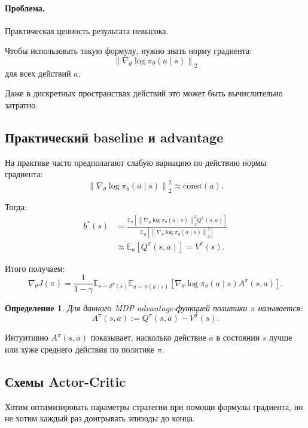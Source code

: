 \documentclass[12pt,a4paper]{article}
\newtheorem{definition}{Определение}
\begin{document}
\paragraph{Проблема.}

Практическая ценность результата невысока.

Чтобы использовать такую формулу, нужно знать норму градиента:
\[
\left\|
\nabla_\theta
\log \pi_\theta(a\mid s)
\right\|_2
\]
для всех действий $a$.

Даже в дискретных пространствах действий это может быть вычислительно затратно.

\subsection{Практический baseline и advantage}

На практике часто предполагают слабую вариацию по действию нормы градиента:
\[
\left\|
\nabla_\theta
\log \pi_\theta(a\mid s)
\right\|_2^2
\approx
\mathrm{const}(a).
\]

Тогда:
\[
\begin{aligned}
b^\ast(s)
&=
\frac{
\mathbb E_a
\left[
\left\|
\nabla_\theta
\log \pi_\theta(a\mid s)
\right\|_2^2
Q^\pi(s,a)
\right]
}{
\mathbb E_a
\left[
\left\|
\nabla_\theta
\log \pi_\theta(a\mid s)
\right\|_2^2
\right]
}
\\
&\approx
\mathbb E_a
\left[
Q^\pi(s,a)
\right]
=
V^\pi(s).
\end{aligned}
\]

Итого получаем:
\[
\nabla_\theta J(\pi)
=
\frac{1}{1-\gamma}
\mathbb E_{s\sim d^\pi(s)}
\mathbb E_{a\sim\pi(a\mid s)}
\left[
\nabla_\theta
\log \pi_\theta(a\mid s)
A^\pi(s,a)
\right].
\]

\begin{definition}
Для данного MDP advantage-функцией политики $\pi$ называется:
\[
A^\pi(s,a)
:=
Q^\pi(s,a)
-
V^\pi(s).
\]
\end{definition}

Интуитивно $A^\pi(s,a)$ показывает, насколько действие $a$ в состоянии $s$ лучше или хуже среднего действия по политике $\pi$.

\subsection{Схемы Actor-Critic}

Хотим оптимизировать параметры стратегии при помощи формулы градиента, но не хотим каждый раз доигрывать эпизоды до конца.
\end{document}
